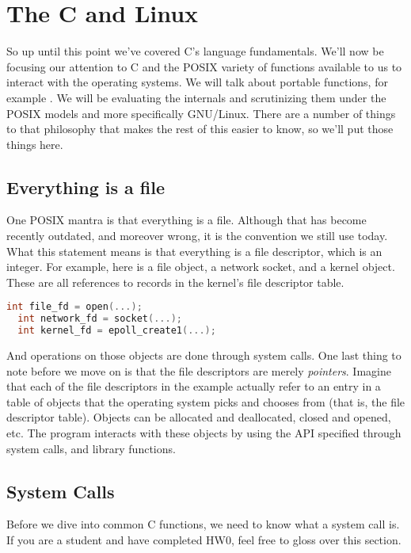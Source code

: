 \section{The C and Linux}

So up until this point we've covered C's language fundamentals.
We'll now be focusing our attention to C and the POSIX variety of functions available to us to interact with the operating systems.
We will talk about portable functions, for example  .
We will be evaluating the internals and scrutinizing them under the POSIX models and more specifically GNU/Linux.
There are a number of things to that philosophy that makes the rest of this easier to know, so we'll put those things here.

\subsection{Everything is a file}

One POSIX mantra is that everything is a file.
Although that has become recently outdated, and moreover wrong, it is the convention we still use today.
What this statement means is that everything is a file descriptor, which is an integer. For example, here is a file object, a network socket, and a kernel object. These are all references to records in the kernel's file descriptor table.

\begin{lstlisting}[language=C]
  int file_fd = open(...);
  int network_fd = socket(...);
  int kernel_fd = epoll_create1(...);
\end{lstlisting}

And operations on those objects are done through system calls.
One last thing to note before we move on is that the file descriptors are merely \textit{pointers}.
Imagine that each of the file descriptors in the example actually refer to an entry in a table of objects that the operating system picks and chooses from (that is, the file descriptor table).
Objects can be allocated and deallocated, closed and opened, etc.
The program interacts with these objects by using the API specified through system calls, and library functions.

\subsection{System Calls}

Before we dive into common C functions, we need to know what a system call is.
If you are a student and have completed HW0, feel free to gloss over this section.

